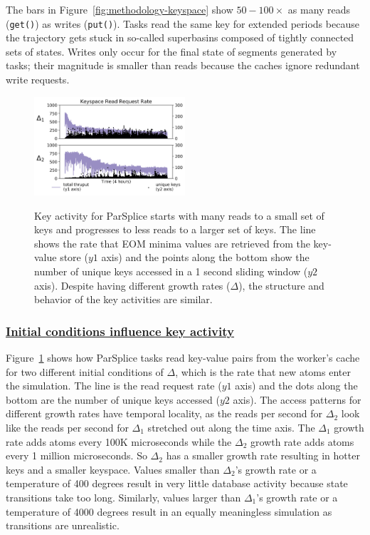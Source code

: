 The bars in Figure~\ref{fig:methodology-keyspace} show \(50-100\times\) as many
reads (\texttt{get()}) as writes (\texttt{put()}).  Tasks read the same key for
extended periods because the trajectory gets stuck in so-called superbasins
composed of tightly connected sets of states.  Writes only occur for the final
state of segments generated by tasks; their magnitude is smaller than reads
because the caches ignore redundant write requests. 

\begin{figure}[t]
  \noindent\includegraphics[width=0.5\textwidth]{figures/motivation-regimes.png}\\
  \caption{Key activity for ParSplice starts with many reads to a small set of
keys and progresses to less reads to a larger set of keys.  The line shows the
rate that EOM minima values are retrieved from the key-value store (\(y1\)
axis) and the points along the bottom show the number of unique keys accessed in a 1
second sliding window (\(y2\) axis). Despite having different growth rates
(\(\Delta\)), the structure and behavior of the key activities are similar.
\label{fig:motivation-regimes}}
\end{figure}

\subsubsection{\underline{Initial conditions influence key activity}}
Figure~\ref{fig:motivation-regimes} shows how ParSplice tasks read key-value
pairs from the worker's cache for two different initial conditions of
\(\Delta\), which is the rate that new atoms enter the simulation.  The line is
the read request rate (\(y1\) axis) and the dots along the bottom are the
number of unique keys accessed (\(y2\) axis).  The access patterns for
different growth rates have temporal locality, as the reads per second for
\(\Delta_2\) look like the reads per second for \(\Delta_1\) stretched out
along the time axis.  The \(\Delta_1\) growth rate adds atoms every 100K
microseconds while the \(\Delta_2\) growth rate adds atoms every 1 million
microseconds. So \(\Delta_2\) has a smaller growth rate resulting in hotter
keys and a smaller keyspace.  Values smaller than \(\Delta_2\)'s growth rate or
a temperature of 400 degrees result in very little database activity because
state transitions take too long. Similarly, values larger than \(\Delta_1\)'s
growth rate or a temperature of 4000 degrees result in an equally meaningless
simulation as transitions are unrealistic.  

